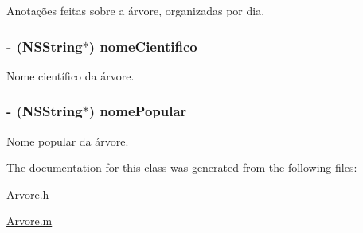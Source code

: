 Anotações feitas sobre a árvore, organizadas por dia. 

\hypertarget{interface_arvore_aa80507632b6a530535acd684f8396c59}{}
\subsubsection[{nome\+Cientifico}]{\setlength{\rightskip}{0pt plus 5cm}-\/ (N\+S\+String$\ast$) nome\+Cientifico\hspace{0.3cm}{\ttfamily [protected]}}\label{interface_arvore_aa80507632b6a530535acd684f8396c59}


Nome científico da árvore. 

\hypertarget{interface_arvore_a4514f27ae9acb812d6b28c4efa625807}{}
\subsubsection[{nome\+Popular}]{\setlength{\rightskip}{0pt plus 5cm}-\/ (N\+S\+String$\ast$) nome\+Popular\hspace{0.3cm}{\ttfamily [protected]}}\label{interface_arvore_a4514f27ae9acb812d6b28c4efa625807}


Nome popular da árvore. 



The documentation for this class was generated from the following files\+:\begin{DoxyCompactItemize}
\item 
\hyperlink{_arvore_8h}{Arvore.\+h}\item 
\hyperlink{_arvore_8m}{Arvore.\+m}\end{DoxyCompactItemize}
